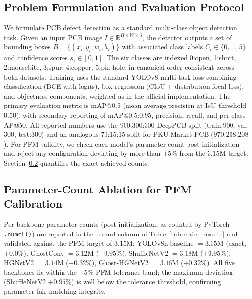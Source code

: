 ﻿\documentclass[conference]{IEEEtran}
\newcommand{\simulated}[1]{#1}
\begin{document}
\subsection{Problem Formulation and Evaluation Protocol}
We formulate PCB defect detection as a standard multi-class object detection task. Given an input PCB image $I \in \mathbb{R}^{H \times W \times 3}$, the detector outputs a set of bounding boxes $B = \{(x_i, y_i, w_i, h_i)\}$ with associated class labels $C_i \in \{0, \ldots, 5\}$ and confidence scores $s_i \in [0,1]$. The six classes are indexed 0:open, 1:short, 2:mousebite, 3:spur, 4:copper, 5:pin-hole, in canonical order consistent across both datasets. Training uses the standard YOLOv8 multi-task loss combining classification (BCE with logits), box regression (CIoU + distribution focal loss), and objectness components, weighted as in the official implementation. The primary evaluation metric is mAP@0.5 (mean average precision at IoU threshold 0.50), with secondary reporting of mAP@0.5:0.95, precision, recall, and per-class AP@50. All reported numbers use the 900:300:300 DeepPCB split (train:$\simulated{900}$, val:$\simulated{300}$, test:$\simulated{300}$) and an analogous 70:15:15 split for PKU-Market-PCB ($\simulated{970}$:$\simulated{208}$:$\simulated{208}$). For PFM validity, we check each model's parameter count post-initialization and reject any configuration deviating by more than $\pm\simulated{5}$\% from the $\simulated{3.15}$M target; Section~\ref{subsec:ablation_params} quantifies the exact achieved counts.

\subsection{Parameter-Count Ablation for PFM Calibration}
\label{subsec:ablation_params}
Per-backbone parameter counts (post-initialization, as counted by PyTorch \texttt{.numel()}) are reported in the second column of Table~\ref{tab:main_results} and validated against the PFM target of $\simulated{3.15}$M: YOLOv8n baseline $=\simulated{3.15}$M (exact, $+0.0$\%), GhostConv $=\simulated{3.12}$M ($-0.95$\%), ShuffleNetV2 $=\simulated{3.18}$M ($+0.95$\%), HGNetV2 $=\simulated{3.14}$M ($-0.32$\%), Ghost-HGNetV2 $=\simulated{3.16}$M ($+0.32$\%). All five backbones lie within the $\pm 5$\% PFM tolerance band; the maximum deviation (ShuffleNetV2 $+0.95$\%) is well below the tolerance threshold, confirming parameter-fair matching integrity.
\end{document}

